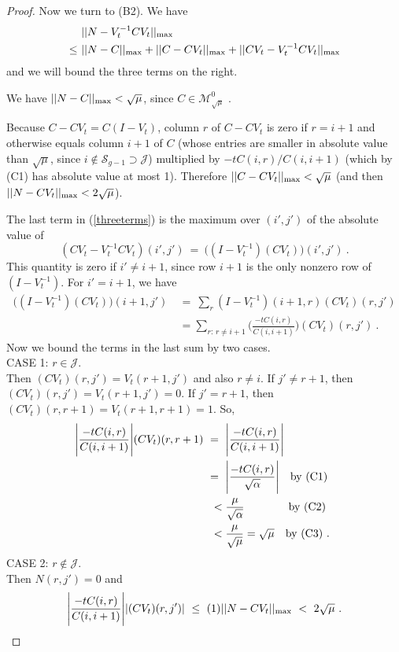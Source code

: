 \documentclass{amsart}
\theoremstyle{definition}
\theoremstyle{remark}
\numberwithin{equation}{section}
\begin{document}
{{\begin{proof}
Now we turn to (B2). We have 
\begin{align} \label{threeterms}
&\ ||N-V_t^{-1}CV_t ||_{\textnormal{max}}  \\ 
\notag 
\leq &\ 
||N-C ||_{\textnormal{max}} + 
||C-CV_t ||_{\textnormal{max}} + 
||CV_t -V_t^{-1}CV_t ||_{\textnormal{max}} 
\end{align}  
and we will bound the three terms on the 
right. 

We have 
$||N-C ||_{\textnormal{max}} < \sqrt{\mu}$,  
since $C\in \mathcal M^0_{\sqrt{\mu}}$ .   


Because 
 $C-CV_t = C(I-V_t)$, 
 column $r$ of $C-CV_t$ is zero if $r=i+1$ 
and otherwise equals column $i+1$ of $C$ (whose entries 
are smaller in absolute value than $\sqrt{\mu}$, since $i\notin 
\mathcal S_{g-1}\supset \mathcal J$) multiplied by 
$-tC(i,r)/C(i,i+1)$ (which by (C1) has absolute value at most 1). Therefore 
$||C-CV_t ||_{\textnormal{max}} <  \sqrt{\mu}$ (and then 
 $||N-CV_t ||_{\textnormal{max}} <  2\sqrt{\mu}$).

The last term in (\ref{threeterms}) is the maximum 
 over $(i',j')$ of the absolute value of 
\[
(CV_t -V_t^{-1}CV_t)(i',j') \ 
= \ 
\Big((I -V_t^{-1})(CV_t)\Big)(i',j') \ . 
\]
This quantity is zero if $i'\neq i+1$, 
since row $i+1$ is the only nonzero row of 
$ (I -V_t^{-1})$. 
For $i'=i+1$, we have 
\begin{align*} 
\Big((I -V_t^{-1})(CV_t)\Big)(i+1,j') 
\ &= \ 
\sum_r
(I -V_t^{-1})(i+1,r)(CV_t)(r,j') \\
& = 
\sum_{ r:\,  r\neq i+1}
\Bigg( \frac{-tC(i,r)}{C(i,i+1)}\Bigg)
(CV_t)(r,j') \ . 
\end{align*}
Now we bound the terms in the last sum by two cases. 
\\
CASE 1: $r\in \mathcal J$. \\
Then $(CV_t)(r,j')=V_t(r+1,j')$  and also $r\neq i$. 
 If $j'\neq r+1$, then 
$(CV_t)(r,j')=V_t(r+1,j')=0$.
If $j'=r+1$, then 
 $(CV_t)(r,r+1)=V_t(r+1,r+1)=
1$. So, 
\begin{align*}
\Bigg| \frac{-tC(i,r)}{C(i,i+1)}\Bigg| 
(CV_t)(r,r+1) 
\ &= \
 \Bigg| \frac{-tC(i,r)}{C(i,i+1)}\Bigg|  \\ 
\ &= \
 \Bigg| \frac{-tC(i,r)}{\sqrt{\alpha}}\Bigg|  
\quad \textnormal{by (C1) }\\
\ &\ <  \frac{\mu}{\sqrt{\alpha}}  
\qquad \qquad  \textnormal{by (C2)} \\
\ &\ <
\frac{\mu}{\sqrt{\mu}} = \sqrt{\mu }
\quad \textnormal{by (C3) . } 
\end{align*} 
CASE 2:  $r\notin \mathcal J$. \\  
Then $N(r,j')=0$ and 
\[
\Bigg| \frac{-tC(i,r)}{C(i,i+1)}\Bigg| 
|(CV_t)(r,j')|  \ 
\leq \ 
(1)||N-CV_t||_{\textnormal{max}} \ < \ 
2\sqrt{\mu} \ . 
\]


\end{proof}}}
\end{document}
